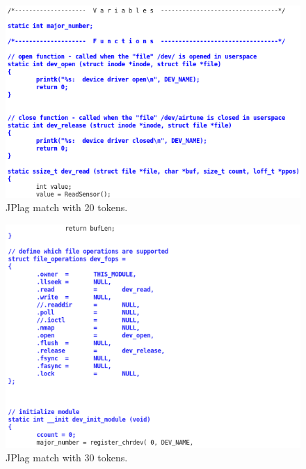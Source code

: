 \documentclass[10pt,journal,compsoc]{IEEEtran}
\begin{document}
		\begin{figure}[h!]
			\includegraphics[width=1.0\textwidth]{jplag20.png}
			\caption{JPlag match with 20 tokens.}
			\label{fig:jplag20}
		\end{figure}
		
		\begin{figure}[h!]
			\includegraphics[width=1.0\textwidth]{jplag30.png}
			\caption{JPlag match with 30 tokens.}
			\label{fig:jplag30}
		\end{figure}
		
\end{document}
